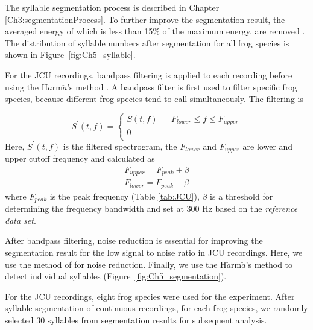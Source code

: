 The syllable segmentation process is described in Chapter \ref{Ch3:segmentationProcess}. To further improve the segmentation result, the averaged energy of which is less than 15\% of the maximum energy, are removed \citep{Gingras2013}. The distribution of syllable numbers after segmentation for all frog species is shown in Figure~\ref{fig:Ch5_syllable}.


For the JCU recordings, bandpass filtering is applied to each recording before using the H$\ddot{a}$rm$\ddot{a}$'s method \citep{harma2003automatic}. A bandpass filter is first used to filter specific frog species, because different frog species tend to call simultaneously.   The filtering is 

$$ S^{'}(t,f) =\left\{
\begin{array}{rcl}
 S(t,f) && F_{lower} \leq f　\leq F_{upper}  \\
0 \\
\end{array}
\right.
$$
Here, $S^{'}(t,f)$ is the filtered spectrogram, the $F_{lower}$ and  $F_{upper}$ are lower and upper cutoff frequency and calculated as 
\begin{equation}
\begin{aligned}
F_{upper} = F_{peak} + \beta \\
F_{lower} = F_{peak} - \beta
\end{aligned}
\end{equation}
\noindent where $F_{peak}$ is the peak frequency (Table \ref{tab:JCU}), $\beta$ is a threshold for determining the frequency bandwidth and set at 300 Hz based on the \textit{reference data set}.

After bandpass filtering, noise reduction is essential for
improving the segmentation result for the low
signal to noise ratio in JCU recordings. Here, we use the method of \cite{towsey2012toolbox} for noise reduction. Finally, we use the H$\ddot{a}$rm$\ddot{a}$'s method to detect individual syllables (Figure~\ref{fig:Ch5_segmentation}). 



For the JCU recordings, eight frog species were used for the experiment. After syllable segmentation of continuous recordings, for each frog species, we randomly selected 30 syllables from segmentation results for subsequent analysis.


